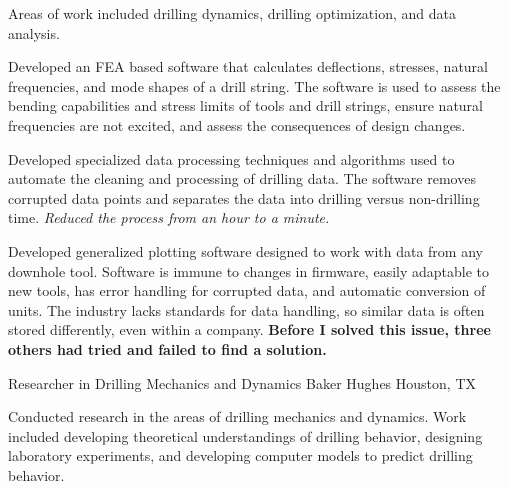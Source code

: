 \documentclass{leresume}
\begin{document}
					\noindent Areas of work included drilling dynamics, drilling optimization, and data analysis.
		\begin{bulletedlist}
			
		\item 
					Developed an FEA based software that calculates deflections, stresses, natural frequencies, and mode shapes of a drill string.  The software is used to assess the bending capabilities and stress limits of tools and drill strings, ensure natural frequencies are not excited, and assess the consequences of design changes.
					
		\item 
					Developed specialized data processing techniques and algorithms used to automate the cleaning and processing of drilling data.  The software removes corrupted data points and separates the data into drilling versus non-drilling time.  
		\textit{Reduced the process from an hour to a minute.}
	
		\item 
					Developed generalized plotting software designed to work with data from any downhole tool.  Software is immune to changes in firmware, easily adaptable to new tools, has error handling for corrupted data, and automatic conversion of units.  The industry lacks standards for data handling, so similar data is often stored differently, even within a company.  
		\textbf{Before I solved this issue, three others had tried and failed to find a solution.}
	
		\end{bulletedlist}
	
            {Researcher in Drilling Mechanics and Dynamics}
            {Baker Hughes}
			{Houston, TX}
			
					\noindent 
				Conducted research in the areas of drilling mechanics and dynamics.  Work included developing theoretical understandings of drilling behavior, designing laboratory experiments, and developing computer models to predict drilling behavior.
			
\end{document}
